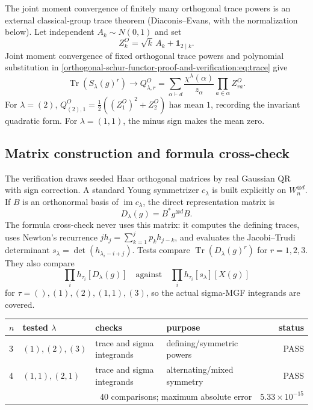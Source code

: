 \documentclass[10pt]{article}
\newcommand{\Tr}{\operatorname{Tr}}
\begin{document}
The joint moment convergence of finitely many orthogonal trace powers is an
external classical-group trace theorem (Diaconis--Evans, with the
normalization below).  Let independent $A_k\sim N(0,1)$ and set
\begin{equation}
 Z_k^O=\sqrt{k}\,A_k+\mathbf1_{2\mid k}.
\end{equation}
Joint moment convergence of fixed orthogonal trace powers and polynomial substitution in \eqref{orthogonal-schur-functor-proof-and-verification:eq:trace} give
\begin{equation}
 \Tr(S_\lambda(g)^r)\longrightarrow Q^O_{\lambda,r}
 =\sum_{\alpha\vdash d}\frac{\chi^\lambda(\alpha)}{z_\alpha}\prod_{a\in\alpha}Z_{ra}^O.
\end{equation}
For $\lambda=(2)$, $Q^O_{(2),1}=\tfrac12((Z_1^O)^2+Z_2^O)$ has mean $1$, recording the invariant quadratic form. For $\lambda=(1,1)$, the minus sign makes the mean zero.

\subsection{Matrix construction and formula cross-check}
The verification draws seeded Haar orthogonal matrices by real Gaussian QR with sign correction. A standard Young symmetrizer $c_\lambda$ is built explicitly on $W_n^{\otimes d}$. If $B$ is an orthonormal basis of $\operatorname{im}c_\lambda$, the direct representation matrix is
\begin{equation}
 D_\lambda(g)=B^*g^{\otimes d}B.
\end{equation}
The formula cross-check never uses this matrix: it computes the defining traces, uses Newton's recurrence $jh_j=\sum_{k=1}^jp_kh_{j-k}$, and evaluates the Jacobi--Trudi determinant $s_\lambda=\det(h_{\lambda_i-i+j})$. Tests compare $\Tr(D_\lambda(g)^r)$ for $r=1,2,3$. They also compare
\begin{equation}
 \prod_i h_{\tau_i}[D_\lambda(g)]
 \quad\text{against}\quad
 \prod_i h_{\tau_i}[s_\lambda][X(g)]
\end{equation}
for $\tau=(),(1),(2),(1,1),(3)$, so the actual sigma-MGF integrands are covered.

\begin{center}\begin{tabular}{@{}llllr@{}}\toprule
$n$ & tested $\lambda$ & checks & purpose & status\\\midrule
3 & $(1),(2),(3)$ & trace and sigma integrands & defining/symmetric powers & PASS\\
4 & $(1,1),(2,1)$ & trace and sigma integrands & alternating/mixed symmetry & PASS\\\midrule
\multicolumn{4}{r}{40 comparisons; maximum absolute error} & $5.33\times10^{-15}$\\\bottomrule
\end{tabular}\end{center}
\end{document}
